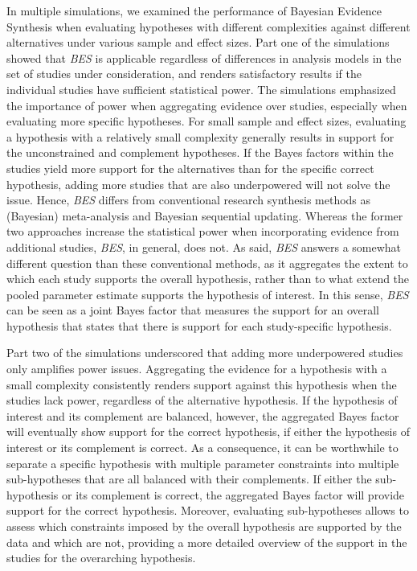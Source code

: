 \documentclass[
]{interact}
\begin{document}
In multiple simulations, we examined the performance of Bayesian
Evidence Synthesis when evaluating hypotheses with different
complexities against different alternatives under various sample and
effect sizes. Part one of the simulations showed that \emph{BES} is
applicable regardless of differences in analysis models in the set of
studies under consideration, and renders satisfactory results if the
individual studies have sufficient statistical power. The simulations
emphasized the importance of power when aggregating evidence over
studies, especially when evaluating more specific hypotheses. For small
sample and effect sizes, evaluating a hypothesis with a relatively small
complexity generally results in support for the unconstrained and
complement hypotheses. If the Bayes factors within the studies yield
more support for the alternatives than for the specific correct
hypothesis, adding more studies that are also underpowered will not
solve the issue. Hence, \emph{BES} differs from conventional research
synthesis methods as (Bayesian) meta-analysis and Bayesian sequential
updating. Whereas the former two approaches increase the statistical
power when incorporating evidence from additional studies, \emph{BES},
in general, does not. As said, \emph{BES} answers a somewhat different
question than these conventional methods, as it aggregates the extent to
which each study supports the overall hypothesis, rather than to what
extend the pooled parameter estimate supports the hypothesis of
interest. In this sense, \emph{BES} can be seen as a joint Bayes factor
that measures the support for an overall hypothesis that states that
there is support for each study-specific hypothesis.

Part two of the simulations underscored that adding more underpowered
studies only amplifies power issues. Aggregating the evidence for a
hypothesis with a small complexity consistently renders support against
this hypothesis when the studies lack power, regardless of the
alternative hypothesis. If the hypothesis of interest and its complement
are balanced, however, the aggregated Bayes factor will eventually show
support for the correct hypothesis, if either the hypothesis of interest
or its complement is correct. As a consequence, it can be worthwhile to
separate a specific hypothesis with multiple parameter constraints into
multiple sub-hypotheses that are all balanced with their complements. If
either the sub-hypothesis or its complement is correct, the aggregated
Bayes factor will provide support for the correct hypothesis. Moreover,
evaluating sub-hypotheses allows to assess which constraints imposed by
the overall hypothesis are supported by the data and which are not,
providing a more detailed overview of the support in the studies for the
overarching hypothesis.
\end{document}
